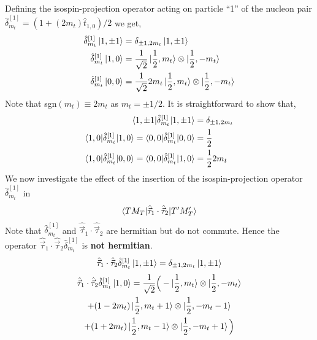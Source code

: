 \documentclass[10pt]{article}
\begin{document}
Defining the isospin-projection operator acting on particle ``1'' of the nucleon pair $ \hat{\delta}_{m_t}^{[1]} = ( 1 + (2 m_t) \hat{t}_{1,0})/2$ we get,
\begin{align*}
	\hat{\delta}_{m_t}^{[1]} \ket{ 1, \pm 1} &= \delta_{\pm 1,2m_t}  \ket{ 1, \pm 1}  \\
	\hat{\delta}_{m_t}^{[1]} \ket{ 1,0} &= \frac{1}{\sqrt{2}} \ket{ \frac{1}{2}, m_t} \otimes \ket{ \frac{1}{2}, -m_t} \\
	\hat{\delta}_{m_t}^{[1]} \ket{ 0,0} &= \frac{1}{\sqrt{2}} 2 m_t \ket{ \frac{1}{2}, m_t} \otimes \ket{ \frac{1}{2}, -m_t}
\end{align*}
Note that sgn$(m_t) \equiv 2m_t$ as $m_t = \pm 1/2$.
It is straightforward to show that,
\begin{align*}
	\braket{ 1, \pm 1 | \hat{\delta}_{m_t}^{[1]} | 1, \pm 1} &= \delta_{\pm 1,2m_t}  \\
	\braket{ 1,0 | \hat{\delta}_{m_t}^{[1]} | 1,0} = \braket{ 0,0 | \hat{\delta}_{m_t}^{[1]} | 0,0} &=  \frac{1}{2} \\
	\braket{ 1,0 | \hat{\delta}_{m_t}^{[1]} | 0,0} = \braket{ 0,0 | \hat{\delta}_{m_t}^{[1]} | 1,0} &=  \frac{1}{2} 2 m_t \\
\end{align*}
We now investigate the effect of the insertion of the isospin-projection operator $\hat{\delta}_{m_t}^{[1]}$ in 
\begin{align*}
	\braket{ T M_T | \hat{\vec{\tau}}_{1} \cdot \hat{\vec{\tau}}_{2} | T' M_T'}
\end{align*}
Note that $\hat{\delta}_{m_t}^{[1]}$ and $ \hat{\vec{\tau}}_{1} \cdot \hat{\vec{\tau}}_{2}$ are hermitian but do not commute. Hence the operator $\hat{\vec{\tau}}_{1} \cdot \hat{\vec{\tau}}_{2} \hat{\delta}_{m_t}^{[1]}$ is \textbf{not hermitian}.
\begin{align*}
	\hat{\vec{\tau}}_{1} \cdot \hat{\vec{\tau}}_{2} \hat{\delta}_{m_t}^{[1]} \ket { 1, \pm 1 } = \delta_{ \pm 1,2 m_t} \ket{ 1, \pm 1 }
\end{align*}
\begin{multline*}
	\hat{\vec{\tau}}_{1} \cdot \hat{\vec{\tau}}_{2} \hat{\delta}_{m_t}^{[1]} \ket { 1, 0 } = \frac{1}{\sqrt{2}} \Big( - \ket{ \frac{1}{2}, m_t} \otimes \ket{ \frac{1}{2}, -m_t} \\
	 + (1-2m_t) \ket{ \frac{1}{2}, m_t + 1} \otimes \ket{ \frac{1}{2},- m_t - 1} \\
	+  (1+2m_t) \ket{ \frac{1}{2}, m_t -1 } \otimes \ket{ \frac{1}{2}, -m_t + 1} \Big) \\
\end{multline*}
\end{document}
